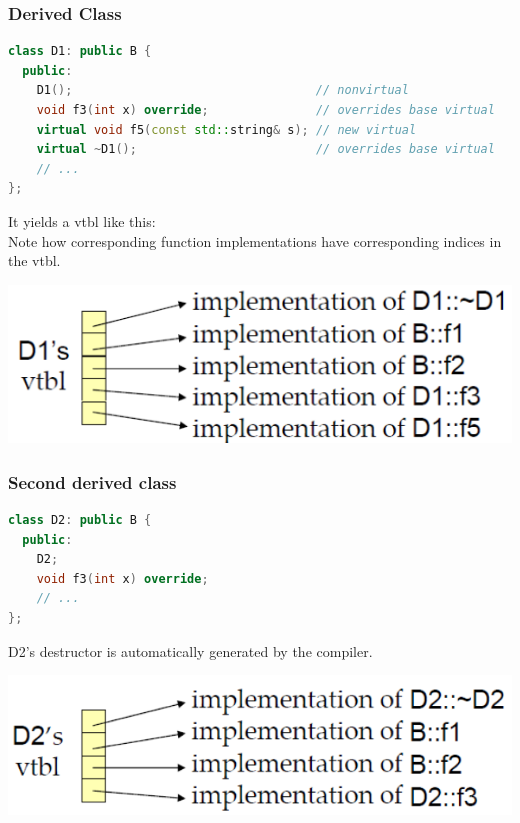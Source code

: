 \subsubsection{Derived Class}
\begin{lstlisting}[language=C++]
class D1: public B {
  public:
    D1();                                  // nonvirtual
    void f3(int x) override;               // overrides base virtual
    virtual void f5(const std::string& s); // new virtual
    virtual ~D1();                         // overrides base virtual
    // ...
};
\end{lstlisting}

\begin{minipage}{0.7\linewidth}
It yields a vtbl like this:\\

Note how corresponding function implementations have corresponding indices in the vtbl.
\end{minipage}%
\begin{minipage}{0.3\linewidth}
\includegraphics[width=\linewidth]{images/AdvancedCPP/vtbl2}
\end{minipage}
\vspace{\baselineskip}

\subsubsection{Second derived class}
\begin{lstlisting}[language=C++]
class D2: public B {
  public:
    D2;
    void f3(int x) override;
    // ...
};
\end{lstlisting}
\begin{minipage}{0.7\linewidth}
D2's destructor is automatically generated by the compiler.
\end{minipage}%
\begin{minipage}{0.3\linewidth}
\includegraphics[width=\linewidth]{images/AdvancedCPP/vtbl3}
\end{minipage}
\vspace{\baselineskip}

